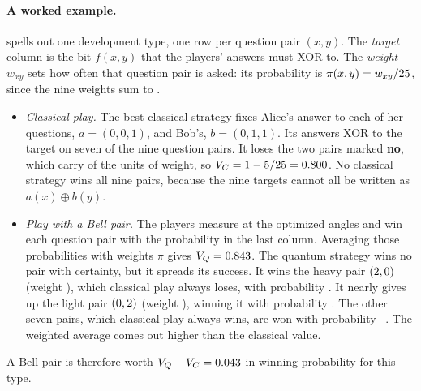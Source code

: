 \documentclass[10pt]{article}
\begin{document}
\paragraph{A worked example.}  spells out one development type, one row per question pair $(x,y)$. The \emph{target} column is the bit $f(x,y)$ that the players' answers must XOR to. The \emph{weight} $w_{xy}$ sets how often that question pair is asked: its probability is $\pi(x,y)=w_{xy}/25$, since the nine weights sum to \xorWeightTotal.
\begin{itemize}[leftmargin=*]
  \item \emph{Classical play.} The best classical strategy fixes Alice's answer to each of her questions, $a=(0,0,1)$, and Bob's, $b=(0,1,1)$. Its answers XOR to the target on seven of the nine question pairs. It loses the two pairs marked \textbf{no}, which carry \xorLost{} of the \xorWeightTotal{} units of weight, so $V_C=1-5/25=0.800$. No classical strategy wins all nine pairs, because the nine targets cannot all be written as $a(x)\oplus b(y)$.
  \item \emph{Play with a Bell pair.} The players measure at the optimized angles and win each question pair with the probability in the last column. Averaging those probabilities with weights $\pi$ gives $V_Q=0.843$. The quantum strategy wins no pair with certainty, but it spreads its success. It wins the heavy pair $(2,0)$ (weight \xorRecW), which classical play always loses, with probability \xorRecQ. It nearly gives up the light pair $(0,2)$ (weight \xorWorstW), winning it with probability \xorWorstQ. The other seven pairs, which classical play always wins, are won with probability \xorOtherMin--\xorOtherMax. The weighted average comes out higher than the classical value.
\end{itemize}
A Bell pair is therefore worth $V_Q-V_C=0.043$ in winning probability for this type.

\begin{table}[H]
\centering\small
\caption{A worked request type (\texttt{qip-development-type-000}). Each row is one question pair: Alice receives $x$ and Bob receives $y$. \emph{Target}: the bit $f(x,y)$ that the answers must XOR to. \emph{Weight} and \emph{probability}: how often the pair is asked. \emph{Best classical strategy}: the players' fixed answers $a(x)$ and $b(y)$, their XOR, and whether it hits the target. \emph{With a Bell pair}: the probability of winning that pair at the optimized measurement angles.}
\label{tab:xor}

\end{table}
\end{document}
